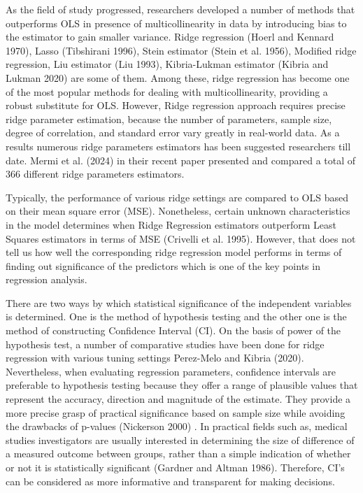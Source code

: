 \documentclass[
]{interact}
\begin{document}
As the field of study progressed, researchers developed a number of
methods that outperforms OLS in presence of multicollinearity in data by
introducing bias to the estimator to gain smaller variance. Ridge
regression (Hoerl and Kennard 1970), Lasso (Tibshirani 1996), Stein
estimator (Stein et al. 1956), Modified ridge regression, Liu estimator
(Liu 1993), Kibria-Lukman estimator (Kibria and Lukman 2020) are some of
them. Among these, ridge regression has become one of the most popular
methods for dealing with multicollinearity, providing a robust
substitute for OLS. However, Ridge regression approach requires precise
ridge parameter estimation, because the number of parameters, sample
size, degree of correlation, and standard error vary greatly in
real-world data. As a results numerous ridge parameters estimators has
been suggested researchers till date. Mermi et al. (2024) in their
recent paper presented and compared a total of 366 different ridge
parameters estimators.

Typically, the performance of various ridge settings are compared to OLS
based on their mean square error (MSE). Nonetheless, certain unknown
characteristics in the model determines when Ridge Regression estimators
outperform Least Squares estimators in terms of MSE (Crivelli et al.
1995). However, that does not tell us how well the corresponding ridge
regression model performs in terms of finding out significance of the
predictors which is one of the key points in regression analysis.

There are two ways by which statistical significance of the independent
variables is determined. One is the method of hypothesis testing and the
other one is the method of constructing Confidence Interval (CI). On the
basis of power of the hypothesis test, a number of comparative studies
have been done for ridge regression with various tuning settings
Perez-Melo and Kibria (2020). Nevertheless, when evaluating regression
parameters, confidence intervals are preferable to hypothesis testing
because they offer a range of plausible values that represent the
accuracy, direction and magnitude of the estimate. They provide a more
precise grasp of practical significance based on sample size while
avoiding the drawbacks of p-values (Nickerson 2000) . In practical
fields such as, medical studies investigators are usually interested in
determining the size of difference of a measured outcome between groups,
rather than a simple indication of whether or not it is statistically
significant (Gardner and Altman 1986). Therefore, CI's can be considered
as more informative and transparent for making decisions.
\end{document}

